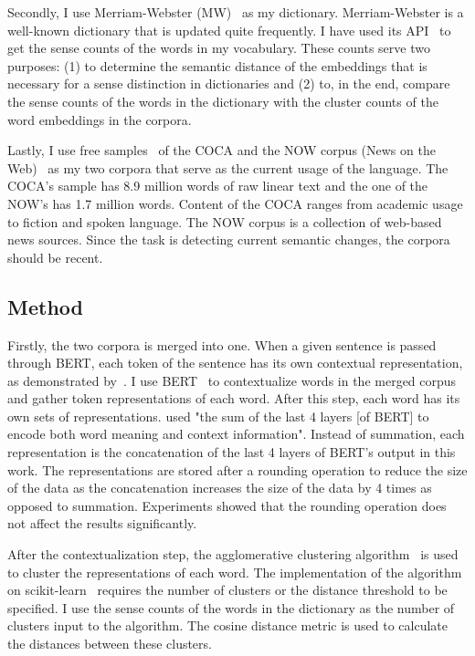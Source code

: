 \documentclass[11pt]{article}
\begin{document}
Secondly, I use Merriam-Webster (MW)~\cite{mw-2023-dictionary} as my dictionary.
Merriam-Webster is a well-known dictionary that is updated quite frequently.
I have used its API~\cite{mw-2023-api} to get the sense counts of the words in my vocabulary.
These counts serve two purposes: (1) to determine the semantic distance of the embeddings that is necessary for a sense distinction in dictionaries and (2) to, in the end, compare the sense counts of the words in the dictionary with the cluster counts of the word embeddings in the corpora.

Lastly, I use free samples~\cite{corpus-data-2023-corpora} of the COCA and the NOW corpus (News on the Web)~\cite{english-corpora-2016-now} as my two corpora that serve as the current usage of the language.
The COCA's sample has 8.9 million words of raw linear text and the one of the NOW's has 1.7 million words.
Content of the COCA ranges from academic usage to fiction and spoken language.
The NOW corpus is a collection of web-based news sources.
Since the task is detecting current semantic changes, the corpora should be recent.

\subsection{Method}

Firstly, the two corpora is merged into one.
When a given sentence is passed through BERT, each token of the sentence has its own contextual representation, as demonstrated by~\cite{pasini-etal-2020-clubert}.
I use BERT~\cite{devlin-etal-2019-bert} to contextualize words in the merged corpus and gather token representations of each word.
After this step, each word has its own sets of representations.
\cite{zhou-li-2020-temporalteller} used "the sum of the last 4 layers [of BERT] to encode both word meaning and context information".
Instead of summation, each representation is the concatenation of the last 4 layers of BERT's output in this work.
The representations are stored after a rounding operation to reduce the size of the data as the concatenation increases the size of the data by 4 times as opposed to summation.
Experiments showed that the rounding operation does not affect the results significantly.

After the contextualization step, the agglomerative clustering algorithm~\cite{florek1951liaison} is used to cluster the representations of each word.
The implementation of the algorithm on scikit-learn~\cite{scikit-learn} requires the number of clusters or the distance threshold to be specified.
I use the sense counts of the words in the dictionary as the number of clusters input to the algorithm.
The cosine distance metric is used to calculate the distances between these clusters.
\end{document}
